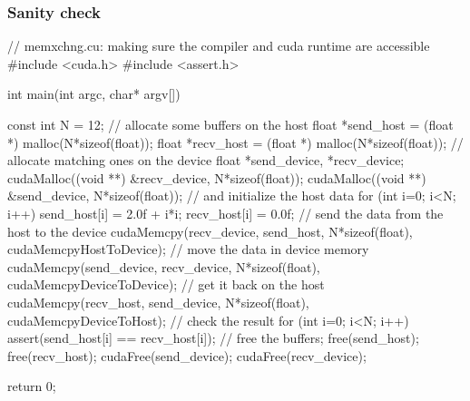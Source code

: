 \begin{frame}[fragile]
%
  \frametitle{Sanity check}
  \label{slide:sanity-cuda}
%
  \begin{C}[basicstyle=\tt\bfseries\tiny]
// memxchng.cu: making sure the compiler and cuda runtime are accessible
#include <cuda.h>
#include <assert.h>

int main(int argc, char* argv[]) {
    const int N = 12;
    // allocate some buffers on the host
    float *send_host = (float *) malloc(N*sizeof(float));
    float *recv_host = (float *) malloc(N*sizeof(float));
    // allocate matching ones on the device
    float *send_device, *recv_device;
    cudaMalloc((void **) &recv_device, N*sizeof(float));
    cudaMalloc((void **) &send_device, N*sizeof(float));
    // and initialize the host data
    for (int i=0; i<N; i++) {
        send_host[i] = 2.0f + i*i;
        recv_host[i] = 0.0f;
    }
    // send the data from the host to the device
    cudaMemcpy(recv_device, send_host, N*sizeof(float), cudaMemcpyHostToDevice);
    // move the data in device memory
    cudaMemcpy(send_device, recv_device, N*sizeof(float), cudaMemcpyDeviceToDevice);
    // get it back on the host
    cudaMemcpy(recv_host, send_device, N*sizeof(float), cudaMemcpyDeviceToHost);
    // check the result
    for (int i=0; i<N; i++) {
      assert(send_host[i] == recv_host[i]);
    }
    // free the buffers;
    free(send_host); free(recv_host);
    cudaFree(send_device); cudaFree(recv_device);

    return 0;
}
  \end{C}
%
\end{frame}

